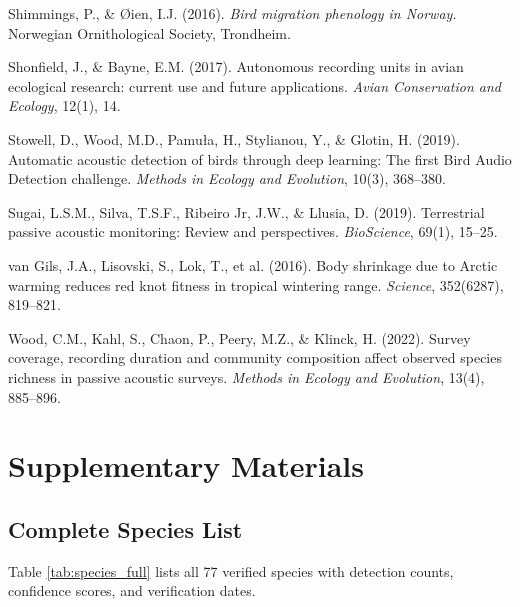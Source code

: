 \documentclass[twocolumn]{article}
\begin{document}
\begin{thebibliography}{99}
 Shimmings, P., \& Øien, I.J. (2016). \textit{Bird migration phenology in Norway}. Norwegian Ornithological Society, Trondheim.

 Shonfield, J., \& Bayne, E.M. (2017). Autonomous recording units in avian ecological research: current use and future applications. \textit{Avian Conservation and Ecology}, 12(1), 14.

 Stowell, D., Wood, M.D., Pamuła, H., Stylianou, Y., \& Glotin, H. (2019). Automatic acoustic detection of birds through deep learning: The first Bird Audio Detection challenge. \textit{Methods in Ecology and Evolution}, 10(3), 368--380.

 Sugai, L.S.M., Silva, T.S.F., Ribeiro Jr, J.W., \& Llusia, D. (2019). Terrestrial passive acoustic monitoring: Review and perspectives. \textit{BioScience}, 69(1), 15--25.

 van Gils, J.A., Lisovski, S., Lok, T., et al. (2016). Body shrinkage due to Arctic warming reduces red knot fitness in tropical wintering range. \textit{Science}, 352(6287), 819--821.

 Wood, C.M., Kahl, S., Chaon, P., Peery, M.Z., \& Klinck, H. (2022). Survey coverage, recording duration and community composition affect observed species richness in passive acoustic surveys. \textit{Methods in Ecology and Evolution}, 13(4), 885--896.

\end{thebibliography}

\newpage
\onecolumn

\appendix
\section{Supplementary Materials}

\subsection{Complete Species List}

Table \ref{tab:species_full} lists all 77 verified species with detection counts, confidence scores, and verification dates.
\end{document}
